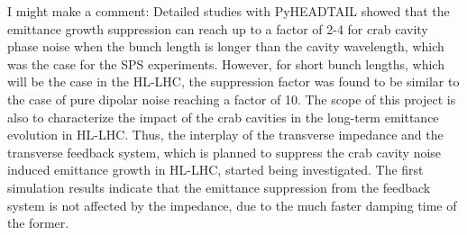 I might make a comment:
Detailed studies with PyHEADTAIL showed that the emittance growth suppression can reach up to a factor of 2-4 for crab cavity phase noise when the bunch length is longer than the cavity wavelength, which was the case for the SPS experiments. However, for short bunch lengths, which will be the case in the HL-LHC, the suppression factor was found to be similar to the case of pure dipolar noise reaching a factor of 10. The scope of this project is also to characterize the impact of the crab cavities in the long-term emittance evolution in HL-LHC. Thus, the interplay of the transverse impedance and the transverse feedback system, which is planned to suppress the crab cavity noise induced emittance growth in HL-LHC, started being investigated. The first simulation results indicate that the emittance suppression from the feedback system is not affected by the impedance, due to the much faster damping time of the former.


